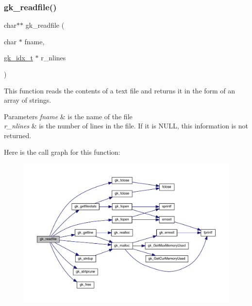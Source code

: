 \mbox{\label{a00077_ad13e689608e193482a6f30b1ade87814}} 
\subsubsection{\texorpdfstring{gk\+\_\+readfile()}{gk\_readfile()}}
{\footnotesize\ttfamily char$\ast$$\ast$ gk\+\_\+readfile (\begin{DoxyParamCaption}\item[{char $\ast$}]{fname,  }\item[{\hyperlink{a00083_a899f9d8c47b1ca0c2fead41097f4bde2}{gk\+\_\+idx\+\_\+t} $\ast$}]{r\+\_\+nlines }\end{DoxyParamCaption})}

This function reads the contents of a text file and returns it in the form of an array of strings. 
\begin{DoxyParams}{Parameters}
{\em fname} & is the name of the file \\
\hline
{\em r\+\_\+nlines} & is the number of lines in the file. If it is N\+U\+LL, this information is not returned. \\
\hline
\end{DoxyParams}
Here is the call graph for this function\+:\nopagebreak
\begin{figure}[H]
\begin{center}
\leavevmode
\includegraphics[width=350pt]{a00077_ad13e689608e193482a6f30b1ade87814_cgraph}
\end{center}
\end{figure}
\mbox{\label{a00077_a297ec0561d579a1772f424fce8886d96}} 

